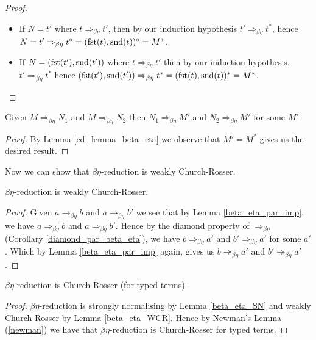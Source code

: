 \begin{proof}
\begin{itemize}
\begin{itemize}
            \item If $N = t'$ where $t \Rightarrow_{\beta\eta} t'$, then by our induction hypothesis $t' \Rightarrow_{\beta\eta} t^*$, hence $N = t' \Rightarrow_{\beta\eta} t^* = (\mathrm{fst}(t), \mathrm{snd}(t))^* = M^*$.
            \item If $N = (\mathrm{fst}(t'), \mathrm{snd}(t'))$ where $t \Rightarrow_{\beta\eta} t'$ then by our induction hypothesis, $t' \Rightarrow_{\beta\eta} t^*$ hence $(\mathrm{fst}(t'), \mathrm{snd}(t')) \Rightarrow_{\beta\eta} t^* = (\mathrm{fst} (t), \mathrm{snd}(t))^* = M^*$.
        \end{itemize}
    \end{itemize}
\end{proof}

\begin{cor}\label{diamond_par_beta_eta}
    Given $M \Rightarrow_{\beta\eta} N_1$ and $M \Rightarrow_{\beta\eta} N_2$ then $N_1 \Rightarrow_{\beta\eta} M'$ and $N_2 \Rightarrow_{\beta\eta} M'$ for some $M'$.
\end{cor}

\begin{proof}
    By Lemma \ref{cd_lemma_beta_eta} we observe that $M' = M^*$ gives us the desired result.
\end{proof}

Now we can show that $\beta\eta$-reduction is weakly Church-Rosser.

\begin{lemma}\label{beta_eta_WCR}
    $\beta\eta$-reduction is weakly Church-Rosser.
\end{lemma}

\begin{proof}
    Given $a \to_{\beta\eta} b$ and $a \to_{\beta\eta} b'$ we see that by Lemma \ref{beta_eta_par_imp}, we have $a \Rightarrow_{\beta\eta} b$ and $a \Rightarrow_{\beta\eta} b'$. Hence by the diamond property of $\Rightarrow_{\beta\eta}$ (Corollary \ref{diamond_par_beta_eta}), we have $b \Rightarrow_{\beta\eta} a'$ and $b' \Rightarrow_{\beta\eta} a'$ for some $a'$. Which by Lemma \ref{beta_eta_par_imp} again, gives us $b \twoheadrightarrow_{\beta\eta} a'$ and $b' \twoheadrightarrow_{\beta\eta} a'$.
\end{proof}

\begin{theorem}
    $\beta\eta$-reduction is Church-Rosser (for typed terms).
\end{theorem}

\begin{proof}
    $\beta\eta$-reduction is strongly normalising by Lemma \ref{beta_eta_SN} and weakly Church-Rosser by Lemma \ref{beta_eta_WCR}. Hence by Newman's Lemma (\ref{newman}) we have that $\beta\eta$-reduction is Church-Rosser for typed terms. 
\end{proof}




